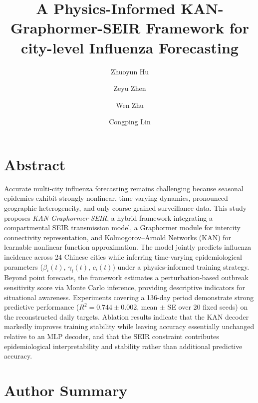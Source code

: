 \documentclass[10pt,letterpaper]{article}
\begin{document}
	\vspace*{0.2in}
	
	\title{A Physics-Informed KAN-Graphormer-SEIR Framework for city-level Influenza Forecasting}
	
	\author[$\ddagger$1]{Zhuoyun Hu}
	\author[$\ddagger$1]{Zeyu Zhen}
	\author[$\ddagger$1]{Wen Zhu}
	\author[*1]{Congping Lin}
	
	
	
	
	
	\maketitle
	\section*{Abstract}
	
	Accurate multi-city influenza forecasting remains challenging because seasonal
	epidemics exhibit strongly nonlinear, time-varying dynamics, pronounced geographic heterogeneity, and only coarse-grained surveillance data. This study
	proposes \textit{KAN-Graphormer-SEIR}, a hybrid framework integrating a compartmental SEIR transmission model, a Graphormer module for intercity connectivity representation, and Kolmogorov--Arnold Networks (KAN) for learnable nonlinear function approximation. The model jointly predicts influenza incidence across 24 Chinese cities while inferring time-varying epidemiological parameters ($\beta_i(t)$, $\gamma_i(t)$, $c_i(t)$) under a physics-informed training strategy. Beyond point forecasts, the framework estimates a perturbation-based outbreak sensitivity score via Monte Carlo inference, providing descriptive indicators for situational awareness. Experiments covering a 136-day period demonstrate strong predictive performance ($R^2 = 0.744 \pm 0.002$, mean $\pm$ SE over 20 fixed seeds) on the reconstructed daily targets. Ablation results indicate that the KAN decoder markedly improves training stability while leaving accuracy essentially unchanged relative to an MLP decoder, and that the SEIR constraint contributes epidemiological interpretability and stability rather than additional predictive accuracy.
	
	\section*{Author Summary}
	
\end{document}
